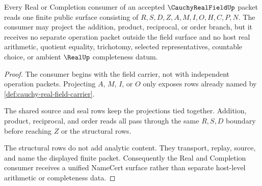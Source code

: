\begin{theorem}
\label{thm:cauchy-real-field-real-completion-consumer-boundary}
Every Real or Completion consumer of an accepted $\CauchyRealFieldUp$ packet reads one finite public surface consisting of $R,S,D,Z,A,M,I,O,H,C,P,N$. The consumer may project the addition, product, reciprocal, or order branch, but it receives no separate operation packet outside the field surface and no host real arithmetic, quotient equality, trichotomy, selected representatives, countable choice, or ambient $\RealUp$ completeness datum.
\end{theorem}
\begin{proof}
The consumer begins with the field carrier, not with independent operation packets. Projecting $A$, $M$, $I$, or $O$ only exposes rows already named by \autoref{def:cauchy-real-field-carrier}.

The shared source and seal rows keep the projections tied together. Addition, product, reciprocal, and order reads all pass through the same $R,S,D$ boundary before reaching $Z$ or the structural rows.

The structural rows do not add analytic content. They transport, replay, source, and name the displayed finite packet. Consequently the Real and Completion consumer receives a unified NameCert surface rather than separate host-level arithmetic or completeness data.
\end{proof}

